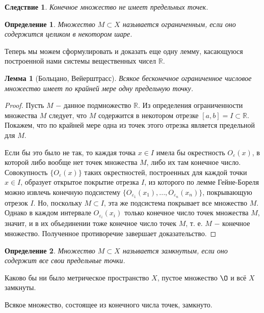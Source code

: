 \documentclass{article}
\newtheorem*{lemma}{Лемма}
\newtheorem{definition}{Определение}[section]
\newtheorem*{consequence}{Следствие}
\begin{document}
\begin{consequence}
Конечное множество не имеет предельных точек.
\end{consequence}

\begin{definition}
Множество \(M \subset X\) называется ограниченным, если оно содержится целиком в некотором шаре.
\end{definition}

Теперь мы можем сформулировать и доказать еще одну лемму, касающуюся построенной нами системы вещественных чисел \(\mathbb{R}\).

\begin{lemma}[Больцано, Вейерштрасс]
Всякое бесконечное ограниченное числовое множество имеет по крайней мере одну предельную точку.
\end{lemma}

\begin{proof}
Пусть \(M\) \(-\) данное подмножество \(\mathbb{R}\). Из определения ограниченности множества \(M\) следует, что \(M\) содержится в некотором отрезке \([a, b] = I \subset \mathbb{R}\). Покажем, что по крайней мере одна из точек этого отрезка является предельной для \(M\).

Если бы это было не так, то каждая точка \(x \in I\) имела бы окрестность \(O_\varepsilon(x)\), в которой либо вообще нет точек множества \(M\), либо их там конечное число. Совокупность \(\{O_\varepsilon(x)\}\) таких окрестностей, построенных для каждой точки \(x \in I\), образует открытое покрытие отрезка \(I\), из которого по лемме Гейне-Бореля можно извлечь конечную подсистему \(\{O_{\varepsilon_1}(x_1), ..., O_{\varepsilon_n}(x_n)\}\), покрывающую отрезок \(I\). Но, поскольку \(M \subset I\), эта же подсистема покрывает все множество \(M\). Однако в каждом интервале \(O_{\varepsilon_i}(x_i)\) только конечное число точек множества \(M\), значит, и в их объединении тоже конечное число точек \(M\), т. е. \(M\) \(-\) конечное множество. Полученное противоречие завершает доказательство.
\end{proof}

\begin{definition}
Множество \(M \subset X\) называется замкнутым, если оно содержит все свои предельные точки.
\end{definition}

Каково бы ни было метрическое пространство \(X\), пустое множество \(\O\) и всё \(X\) замкнуты.

Всякое множество, состоящее из конечного числа точек, замкнуто.
\end{document}
